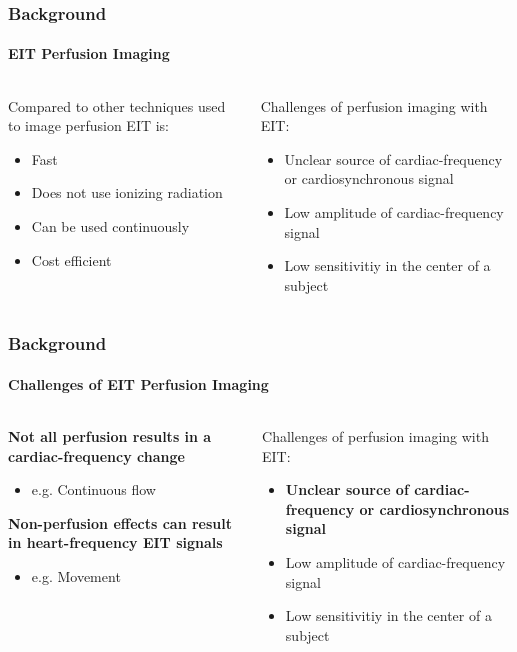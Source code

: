 \documentclass[10pt,    %
    english,            %
    xcolor=table,       %
    envcountsect,        %
    aspectratio=1610
]{beamer}
\begin{document}
\begin{frame}
	\frametitle{Background}
	\framesubtitle{EIT Perfusion Imaging}
\begin{columns}[c]
\begin{column}{0.5\textwidth}
	Compared to other techniques used to image perfusion EIT is: \\ \vspace{2mm}
	\begin{itemize}
		\item Fast 
		\item Does not use ionizing radiation 
		\item Can be used continuously 
		\item Cost efficient 
	\end{itemize}
\end{column}
\begin{column}{0.5\textwidth}
	Challenges of perfusion imaging with EIT: \\ \vspace{5mm}
	\begin{itemize}
		\item Unclear source of cardiac-frequency or cardiosynchronous signal
		\item Low amplitude of cardiac-frequency signal
		\item Low sensitivitiy in the center of a subject
	\end{itemize}
\end{column}
\end{columns}
\end{frame}

\begin{frame}
	\frametitle{Background}
	\framesubtitle{Challenges of EIT Perfusion Imaging}
\begin{columns}[c]
\begin{column}{0.5\textwidth}
\textbf{\large Not all perfusion results in a cardiac-frequency change}
\begin{itemize}
	\item e.g. Continuous flow
\end{itemize} %
\vspace{10mm}
\textbf{\large Non-perfusion effects can result in heart-frequency EIT signals}
\begin{itemize}
	\item e.g. Movement
\end{itemize}

\end{column}
\begin{column}{0.5\textwidth}
	Challenges of perfusion imaging with EIT: \\ \vspace{5mm}
	\begin{itemize}
		\item \textbf{Unclear source of cardiac-frequency or cardiosynchronous signal}
		\item Low amplitude of cardiac-frequency signal
		\item Low sensitivitiy in the center of a subject
	\end{itemize}
\end{column}
\end{columns}
\end{frame}
\end{document}
